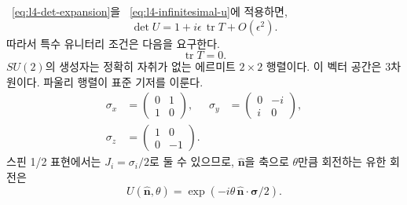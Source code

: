 ~\eqref{eq:l4-det-expansion}을 ~\eqref{eq:l4-infinitesimal-u}에 적용하면,
\begin{equation}
\det U
=1+i\epsilon\,\operatorname{tr}T+O(\epsilon^2).
\end{equation}
따라서 특수 유니터리 조건은 다음을 요구한다.
\begin{equation}
\operatorname{tr}T=0.
\label{eq:l4-traceless-generator}
\end{equation}
\(SU(2)\)의 생성자는 정확히 자취가 없는 에르미트 \(2\times2\) 행렬이다. 이 벡터 공간은 3차원이다. 파울리 행렬이 표준 기저를 이룬다.
\begin{equation}
\begin{aligned}
\sigma_x&=
\begin{pmatrix}0&1\\1&0\end{pmatrix},
&
\sigma_y&=
\begin{pmatrix}0&-i\\i&0\end{pmatrix},
\\[0.4em]
\sigma_z&=
\begin{pmatrix}1&0\\0&-1\end{pmatrix}.
\end{aligned}
\end{equation}
스핀 1/2 표현에서는 \(J_i=\sigma_i/2\)로 둘 수 있으므로, \(\hat{\boldsymbol n}\)을 축으로 \(\theta\)만큼 회전하는 유한 회전은
\begin{equation}
U(\hat{\boldsymbol n},\theta)
=\exp\!\left(-i\theta\,
\hat{\boldsymbol n}\cdot\boldsymbol\sigma/2\right).
\end{equation}

\begin{classroomqa}
\end{classroomqa}

\begin{classroomqa}
\end{classroomqa}

